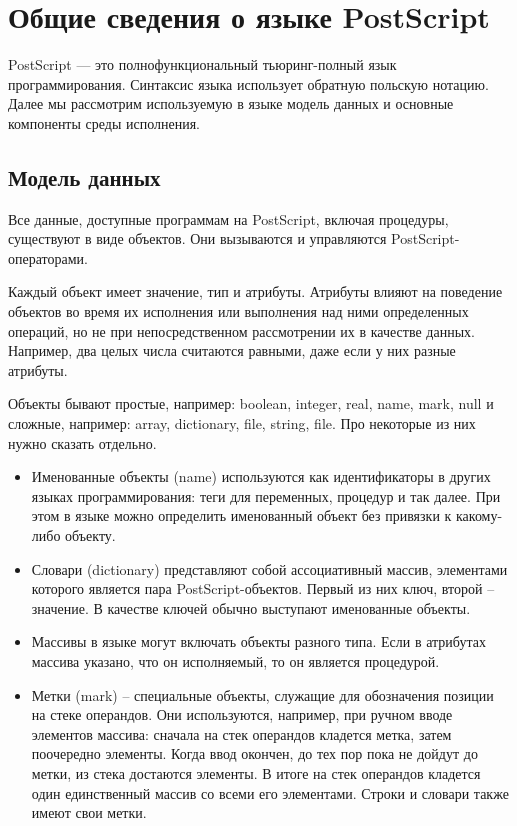 \section{Общие сведения о языке PostScript}
PostScript --- это полнофункциональный тьюринг-полный язык программирования. Синтаксис языка использует обратную польскую нотацию. Далее мы рассмотрим используемую в языке модель данных и основные компоненты среды исполнения.

\subsection{Модель данных}
Все данные, доступные программам на PostScript, включая процедуры, существуют в виде объектов. Они вызываются и управляются  PostScript-операторами. 

Каждый объект имеет значение, тип и атрибуты. Атрибуты влияют на поведение объектов во время их исполнения или выполнения над ними определенных операций, но не при непосредственном рассмотрении их в качестве данных. Например, два целых числа считаются равными, даже если у них разные атрибуты.

Объекты бывают простые, например: boolean, integer, real, name, mark, null и сложные, например: array, dictionary, file, string, file. Про некоторые из них нужно сказать отдельно.
\begin{itemize}
\item Именованные объекты (name) используются как идентификаторы в других языках программирования: теги для переменных, процедур и так далее. При этом в языке можно определить именованный объект без привязки к какому-либо объекту.
\item Словари (dictionary) представляют собой ассоциативный массив, элементами которого является пара PostScript-объектов. Первый из них ключ, второй -- значение. В качестве ключей обычно выступают именованные объекты.
\item Массивы в языке могут включать объекты разного типа. Если в атрибутах массива указано, что он исполняемый, то он является процедурой.
\item Метки (mark) -- специальные объекты, служащие для обозначения позиции на стеке операндов. Они используются, например, при ручном вводе элементов массива: сначала на стек операндов кладется метка, затем поочередно элементы. Когда ввод окончен, до тех пор пока не дойдут до метки, из стека достаются элементы. В итоге на стек операндов кладется один единственный массив со всеми его элементами. Строки и словари также имеют свои метки.
\end{itemize}

